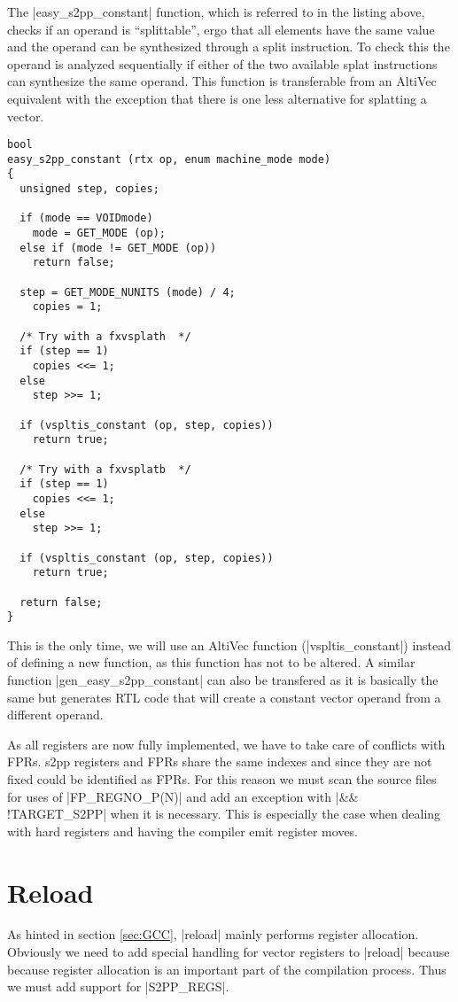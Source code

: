 The |easy_s2pp_constant| function, which is referred to in the listing above, checks if an operand is ``splittable'', ergo that all elements have the same value and the operand can be synthesized through a split instruction.
To check this the operand is analyzed sequentially if either of the two available splat instructions can synthesize the same operand.
This function is transferable from an AltiVec equivalent with the exception that there is one less alternative for splatting a vector.
\begin{lstlisting}
bool
easy_s2pp_constant (rtx op, enum machine_mode mode)
{
  unsigned step, copies;

  if (mode == VOIDmode)
    mode = GET_MODE (op);
  else if (mode != GET_MODE (op))
    return false;

  step = GET_MODE_NUNITS (mode) / 4;
    copies = 1;

  /* Try with a fxvsplath  */
  if (step == 1)
    copies <<= 1;
  else
    step >>= 1;

  if (vspltis_constant (op, step, copies))
    return true;

  /* Try with a fxvsplatb  */
  if (step == 1)
    copies <<= 1;
  else
    step >>= 1;

  if (vspltis_constant (op, step, copies))
    return true;

  return false;
}
\end{lstlisting}

This is the only time, we will use an AltiVec function (|vspltis_constant|) instead of defining a new function, as this function has not to be altered.
A similar function |gen_easy_s2pp_constant| can also be transfered as it is basically the same but generates \ac{RTL} code that will create a constant vector operand from a different operand.

As all registers are now fully implemented, we have to take care of conflicts with FPRs.
s2pp registers and FPRs share the same indexes and since they are not fixed could be identified as FPRs.
For this reason we must scan the source files for uses of |FP_REGNO_P(N)| and add an exception with |&& !TARGET_S2PP| when it is necessary.
This is especially the case when dealing with hard registers and having the compiler emit register moves.

\section{Reload}
As hinted in section \ref{sec:GCC}, |reload| mainly performs register allocation.
Obviously we need to add special handling for vector registers to |reload| because because register allocation is an important part of the compilation process.
Thus we must add support for |S2PP_REGS|.

